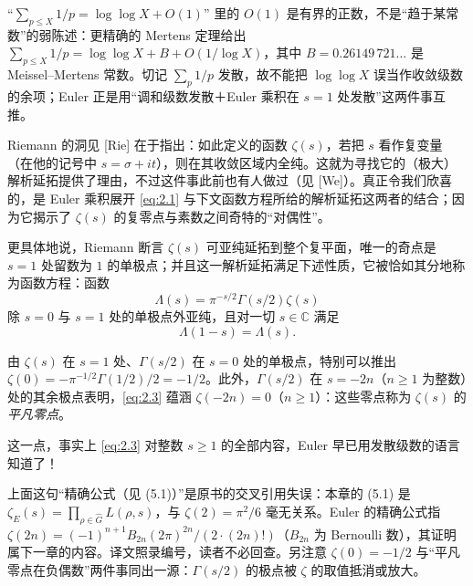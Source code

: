 \begin{annote}
“$\sum_{p\le X}1/p=\log\log X+O(1)$” 里的 $O(1)$ 是有界的正数，不是“趋于某常数”的弱陈述：更精确的 Mertens 定理给出 $\sum_{p\le X}1/p=\log\log X+B+O(1/\log X)$，其中 $B=0.26149\,721\ldots$ 是 Meissel--Mertens 常数。切记 $\sum_p 1/p$ 发散，故不能把 $\log\log X$ 误当作收敛级数的余项；Euler 正是用“调和级数发散＋Euler 乘积在 $s=1$ 处发散”这两件事互推。
\par\vspace{0.15em}{\raggedleft 【来源：Serre《A Course in Arithmetic》Ch.~VI \S1（A）；nLab “Riemann zeta function” 条目（B，与 A 交叉）】\par}
\end{annote}

Riemann 的洞见 [Rie] 在于指出：如此定义的函数 $\zeta(s)$，若把 $s$ 看作复变量（在他的记号中 $s=\sigma+it$），则在其收敛区域内全纯。这就为寻找它的（极大）解析延拓提供了理由，不过这件事此前也有人做过（见 [We]）。真正令我们欣喜的，是 Euler 乘积展开 \eqref{eq:2.1} 与下文函数方程所给的解析延拓这两者的结合；因为它揭示了 $\zeta(s)$ 的复零点与素数之间奇特的“对偶性”。

更具体地说，Riemann 断言 $\zeta(s)$ 可亚纯延拓到整个复平面，唯一的奇点是 $s=1$ 处留数为 $1$ 的单极点；并且这一解析延拓满足下述性质，它被恰如其分地称为函数方程：函数
\begin{equation}\tag{2.2}\label{eq:2.2}
\Lambda(s)=\pi^{-s/2}\Gamma(s/2)\zeta(s)
\end{equation}
除 $s=0$ 与 $s=1$ 处的单极点外亚纯，且对一切 $s\in\mathbb{C}$ 满足
\begin{equation}\tag{2.3}\label{eq:2.3}
\Lambda(1-s)=\Lambda(s).
\end{equation}

由 $\zeta(s)$ 在 $s=1$ 处、$\Gamma(s/2)$ 在 $s=0$ 处的单极点，特别可以推出 $\zeta(0)=-\pi^{-1/2}\Gamma(1/2)/2=-1/2$。此外，$\Gamma(s/2)$ 在 $s=-2n$（$n\ge 1$ 为整数）处的其余极点表明，\eqref{eq:2.3} 蕴涵 $\zeta(-2n)=0$（$n\ge 1$）：这些零点称为 $\zeta(s)$ 的\emph{平凡零点}。

这一点，事实上 \eqref{eq:2.3} 对整数 $s\ge 1$ 的全部内容，Euler 早已用发散级数的语言知道了！

\begin{annote}
上面这句“精确公式（见 (5.1)）”是原书的交叉引用失误：本章的 (5.1) 是 $\zeta_E(s)=\prod_{\rho\in\widehat G}L(\rho,s)$，与 $\zeta(2)=\pi^2/6$ 毫无关系。Euler 的精确公式指 $\zeta(2n)=(-1)^{n+1}B_{2n}(2\pi)^{2n}/(2\cdot(2n)!)$（$B_{2n}$ 为 Bernoulli 数），其证明属下一章的内容。译文照录编号，读者不必回查。另注意 $\zeta(0)=-1/2$ 与“平凡零点在负偶数”两件事同出一源：$\Gamma(s/2)$ 的极点被 $\zeta$ 的取值抵消或放大。
\par\vspace{0.15em}{\raggedleft 【来源：原书 p.1 与 p.13 公式编号对照（A）；Titchmarsh《The Theory of the Riemann Zeta-Function》Ch.~2（A）】\par}
\end{annote}

